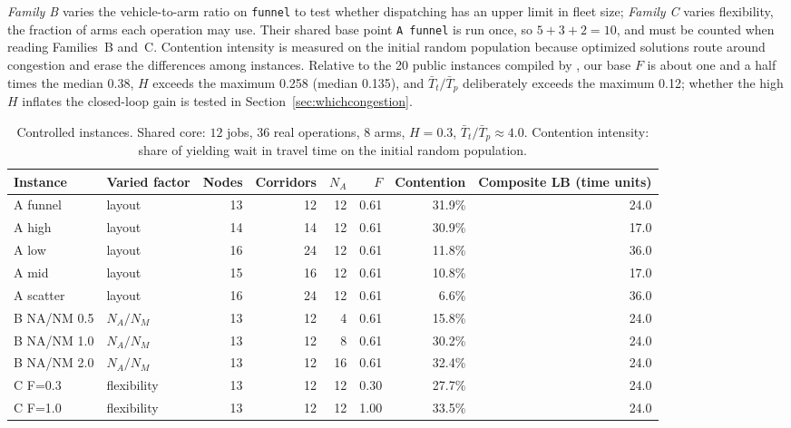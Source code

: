 \documentclass[preprint,review,12pt,authoryear,doubleblind]{elsarticle}
\newcommand{\NCases}{10}
\newcommand{\PubFMed}{0.38}              %
\newcommand{\PubHMed}{0.135}             %
\newcommand{\PubHMax}{0.258}             %
\newcommand{\PubTtTpHi}{0.12}            %
\newcommand{\PubNInst}{20}
\begin{document}
\emph{Family B} varies the vehicle-to-arm ratio on \texttt{funnel} to test whether dispatching has an upper limit in fleet size; \emph{Family C} varies flexibility, the fraction of arms each operation may use.
Their shared base point \texttt{A funnel} is run once, so $5+3+2=\NCases$, and must be counted when reading Families~B and~C.
Contention intensity is measured on the initial random population because optimized solutions route around congestion and erase the differences among instances.
Relative to the \PubNInst{} public instances compiled by \citet{homayouni2021production}, our base $F$ is about one and a half times the median \PubFMed{}, $H$ exceeds the maximum \PubHMax{} (median \PubHMed{}), and $\bar{T}_t/\bar{T}_p$ deliberately exceeds the maximum \PubTtTpHi{}; whether the high $H$ inflates the closed-loop gain is tested in Section~\ref{sec:whichcongestion}.

\begin{table}[!htbp]
\caption{Controlled instances. Shared core: $12$ jobs, $36$ real operations, $8$ arms, $H=0.3$, $\bar{T}_t/\bar{T}_p\approx4.0$.
Contention intensity: share of yielding wait in travel time on the initial random population.}
\label{tab:instances}
\small
\begin{adjustbox}{max width=\linewidth}\begin{tabular}{@{}llrrrrrr@{}}
\toprule
Instance & Varied factor & Nodes & Corridors & $N_A$ & $F$ & Contention & Composite LB (time units) \\
\midrule
A funnel & layout & 13 & 12 & 12 & 0.61 & 31.9\% & 24.0 \\
A high & layout & 14 & 14 & 12 & 0.61 & 30.9\% & 17.0 \\
A low & layout & 16 & 24 & 12 & 0.61 & 11.8\% & 36.0 \\
A mid & layout & 15 & 16 & 12 & 0.61 & 10.8\% & 17.0 \\
A scatter & layout & 16 & 24 & 12 & 0.61 & 6.6\% & 36.0 \\
\midrule
B NA/NM 0.5 & $N_A/N_M$ & 13 & 12 & 4 & 0.61 & 15.8\% & 24.0 \\
B NA/NM 1.0 & $N_A/N_M$ & 13 & 12 & 8 & 0.61 & 30.2\% & 24.0 \\
B NA/NM 2.0 & $N_A/N_M$ & 13 & 12 & 16 & 0.61 & 32.4\% & 24.0 \\
\midrule
C F=0.3 & flexibility & 13 & 12 & 12 & 0.30 & 27.7\% & 24.0 \\
C F=1.0 & flexibility & 13 & 12 & 12 & 1.00 & 33.5\% & 24.0 \\
\bottomrule
\end{tabular}\end{adjustbox}
\end{table}
\end{document}
